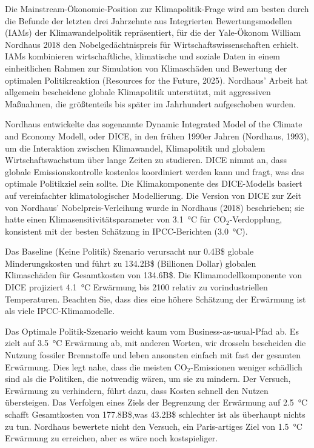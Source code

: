 \documentclass[12pt,paper=a4,DIV=12,parskip=never,chapterprefix=false,headings=standardclasses]{scrreprt}
\begin{document}
Die Mainstream-Ökonomie-Position zur Klimapolitik-Frage wird am besten durch die Befunde der letzten drei Jahrzehnte aus Integrierten Bewertungsmodellen (IAMs) der Klimawandelpolitik repräsentiert, für die der Yale-Ökonom William Nordhaus 2018 den Nobelgedächtnispreis für Wirtschaftswissenschaften erhielt. IAMs kombinieren wirtschaftliche, klimatische und soziale Daten in einem einheitlichen Rahmen zur Simulation von Klimaschäden und Bewertung der optimalen Politikreaktion (Resources for the Future, 2025). Nordhaus' Arbeit hat allgemein bescheidene globale Klimapolitik unterstützt, mit aggressiven Maßnahmen, die größtenteils bis später im Jahrhundert aufgeschoben wurden.

Nordhaus entwickelte das sogenannte Dynamic Integrated Model of the Climate and Economy Modell, oder DICE, in den frühen 1990er Jahren (Nordhaus, 1993), um die Interaktion zwischen Klimawandel, Klimapolitik und globalem Wirtschaftswachstum über lange Zeiten zu studieren. DICE nimmt an, dass globale Emissionskontrolle kostenlos koordiniert werden kann und fragt, was das optimale Politikziel sein sollte. Die Klimakomponente des DICE-Modells basiert auf vereinfachter klimatologischer Modellierung. Die Version von DICE zur Zeit von Nordhaus' Nobelpreis-Verleihung wurde in Nordhaus (2018) beschrieben; sie hatte einen Klimasensitivitätsparameter von \SI{3.1}{\celsius} für CO$_2$-Verdopplung, konsistent mit der besten Schätzung in IPCC-Berichten (\SI{3.0}{\celsius}).

Das Baseline (Keine Politik) Szenario verursacht nur 0.4B\$ globale Minderungskosten und führt zu 134.2B\$ (Billionen Dollar) globalen Klimaschäden für Gesamtkosten von 134.6B\$. Die Klimamodellkomponente von DICE projiziert \SI{4.1}{\celsius} Erwärmung bis 2100 relativ zu vorindustriellen Temperaturen. Beachten Sie, dass dies eine höhere Schätzung der Erwärmung ist als viele IPCC-Klimamodelle.

Das Optimale Politik-Szenario weicht kaum vom Business-as-usual-Pfad ab. Es zielt auf \SI{+3.5}{\celsius} Erwärmung ab, mit anderen Worten, wir drosseln bescheiden die Nutzung fossiler Brennstoffe und leben ansonsten einfach mit fast der gesamten Erwärmung. Dies legt nahe, dass die meisten CO$_2$-Emissionen weniger schädlich sind als die Politiken, die notwendig wären, um sie zu mindern. Der Versuch, Erwärmung zu verhindern, führt dazu, dass Kosten schnell den Nutzen übersteigen. Das Verfolgen eines Ziels der Begrenzung der Erwärmung auf \SI{2.5}{\celsius} schafft Gesamtkosten von 177.8B\$,was 43.2B\$ schlechter ist als überhaupt nichts zu tun. Nordhaus bewertete nicht den Versuch, ein Paris-artiges Ziel von \SI{1.5}{\celsius} Erwärmung zu erreichen, aber es wäre noch kostspieliger.
\end{document}
